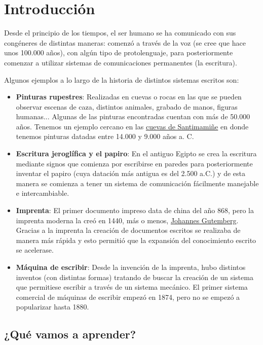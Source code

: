 \chapter{Introducción}
Desde el principio de los tiempos, el ser humano se ha comunicado con sus congéneres de distintas maneras: comenzó a través de la voz (se cree que hace unos 100.000 años), con algún tipo de protolenguaje, para posteriormente comenzar a utilizar sistemas de comunicaciones permanentes (la escritura).

Algunos ejemplos a lo largo de la historia de distintos sistemas escritos son:
\begin{itemize}
    \item \textbf{Pinturas rupestres}: Realizadas en cuevas o rocas en las que se pueden observar escenas de caza, distintos animales, grabado de manos, figuras humanas... Algunas de las pinturas encontradas cuentan con más de 50.000 años. Tenemos un ejemplo cercano en las \href{https://es.wikipedia.org/wiki/Cueva_de_Santimami\%C3\%B1e}{cuevas de Santimamiñe} en donde tenemos pinturas datadas entre 14.000 y 9.000 años a. C.

    \item \textbf{Escritura jeroglífica y el papiro}: En el antiguo Egipto se crea la escritura mediante signos que comienza por escribirse en paredes para posteriormente inventar el papiro (cuya datación más antigua es del 2.500 a.C.) y de esta manera se comienza a tener un sistema de comunicación fácilmente manejable e intercambiable.

    \item \textbf{Imprenta}: El primer documento impreso data de china del año 868, pero la imprenta moderna la creó en 1440, más o menos, \href{https://es.wikipedia.org/wiki/Johannes_Gutenberg}{Johannes Gutemberg}. Gracias a la imprenta la creación de documentos escritos se realizaba de manera más rápida y esto permitió que la expansión del conocimiento escrito se acelerase.

    \item \textbf{Máquina de escribir}: Desde la invención de la imprenta, hubo distintos inventos (con distintas formas) tratando de buscar la creación de un sistema que permitiese escribir a través de un sistema mecánico. El primer sistema comercial de máquinas de escribir empezó en 1874, pero no se empezó a popularizar hasta 1880.
\end{itemize}

\section{¿Qué vamos a aprender?}


